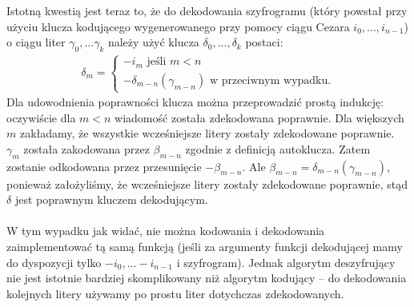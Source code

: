 \documentclass[a4paper]{article}
\theoremstyle{defn}
\theoremstyle{theorem}
\theoremstyle{lemma}
\theoremstyle{cor}
\theoremstyle{fact}
\begin{document}
Istotną kwestią jest teraz to, że do dekodowania szyfrogramu (który powstał przy użyciu klucza kodującego wygenerowanego przy pomocy ciągu Cezara $i_0, ..., i_{n-1}$) o ciągu liter $\gamma_0, ... \gamma_k$ należy użyć klucza $\delta_0, ..., \delta_k$ postaci:
\begin{align*}
\delta_m = 
\begin{cases}
  -i_m \text{ jeśli } m < n  \\
  -\delta_{m-n}(\gamma_{m-n}) \text{ w przeciwnym wypadku}.
\end{cases}
\end{align*}
Dla udowodnienia poprawności klucza można przeprowadzić prostą indukcję: oczywiście dla $m < n$ wiadomość została zdekodowana poprawnie. Dla większych $m$ zakładamy, że wszystkie wcześniejsze litery zostały zdekodowane poprawnie. $\gamma_m$ została zakodowana przez $\beta_{m-n}$ zgodnie z definicją autoklucza. Zatem zostanie odkodowana przez przesunięcie $-\beta_{m-n}$. Ale $\beta_{m-n} = \delta_{m-n}(\gamma_{m-n})$, ponieważ założyliśmy, że wcześniejsze litery zostały zdekodowane poprawnie, stąd $\delta$ jest poprawnym kluczem dekodującym. \\\\
W tym wypadku jak widać, nie można kodowania i dekodowania zaimplementować tą samą funkcją (jeśli za argumenty funkcji dekodującej mamy do dyspozycji tylko $-i_0, ... -i_{n-1}$ i szyfrogram). Jednak algorytm deszyfrujący nie jest istotnie bardziej skomplikowany niż algorytm kodujący – do dekodowania kolejnych litery używamy po prostu liter dotychczas zdekodowanych. \\
\end{document}
